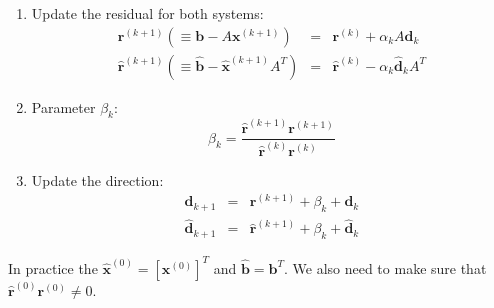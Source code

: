 \begin{enumerate}
\begin{enumerate}
        \item Update the residual for both systems:
        \begin{equation*}
            \begin{array}{rcl}
                \mathbf{r}^{\left(k+1\right)} \left(\equiv \mathbf{b} - A \mathbf{x}^{\left(k+1\right)}\right) &=& \mathbf{r}^{\left(k\right)} + \alpha_{k}A\mathbf{d}_{k} \\ [.5em]
                \widehat{\mathbf{r}}^{\left(k+1\right)} \left(\equiv \widehat{\mathbf{b}} - \widehat{\mathbf{x}}^{\left(k+1\right)} A^{T} \right) &=& \widehat{\mathbf{r}}^{\left(k\right)} - \alpha_{k}\widehat{\mathbf{d}}_{k} A^{T}
            \end{array}
        \end{equation*}

        \item Parameter $\beta_{k}$:
        \begin{equation*}
            \beta_{k} = \dfrac{
                \widehat{\mathbf{r}}^{\left(k+1\right)} \mathbf{r}^{\left(k+1\right)}
            }{
                \widehat{\mathbf{r}}^{\left(k\right)} \mathbf{r}^{\left(k\right)}
            }
        \end{equation*}

        \item Update the direction:
        \begin{equation*}
            \begin{array}{rcl}
                \mathbf{d}_{k+1}            &=& \mathbf{r}^{\left(k+1\right)} + \beta_{k} + \mathbf{d}_{k} \\ [.5em]
                \widehat{\mathbf{d}}_{k+1}  &=& \widehat{\mathbf{r}}^{\left(k+1\right)} + \beta_{k} + \widehat{\mathbf{d}}_{k}
            \end{array}
        \end{equation*}
    \end{enumerate}
\end{enumerate}
In practice the $\widehat{\mathbf{x}}^{\left(0\right)} = \left[\mathbf{x}^{\left(0\right)}\right]^{T}$ and $\widehat{\mathbf{b}} = \mathbf{b}^{T}$. We also need to make sure that $\widehat{\mathbf{r}}^{\left(0\right)}\mathbf{r}^{\left(0\right)} \ne 0$.

